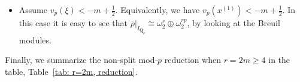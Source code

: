 \documentclass[11pt]{amsart}
\theoremstyle{definition}
\numberwithin{equation}{subsection}
\theoremstyle{plain}
\theoremstyle{plain}
\theoremstyle{plain}
\theoremstyle{plain}
\theoremstyle{plain}
\theoremstyle{plain}
\theoremstyle{plain}
\theoremstyle{plain}
\theoremstyle{plain}
\theoremstyle{plain}
\theoremstyle{plain}
\theoremstyle{plain}
\theoremstyle{definition}
\theoremstyle{definition}
\theoremstyle{definition}
\theoremstyle{remark}
\renewcommand{\(}{\textup{(}}
\renewcommand{\)}{\textup{)}}
\newcommand{\Q}{\mathbf{Q}}
\newcommand{\Qp}{\mathbf{Q}_p}
\newcommand{\rhobar}{\overline{\rho}}
\begin{document}
\begin{itemize}[leftmargin=*]
\begin{itemize}[leftmargin=*]
    \item If $v_p(\Theta)=0$, then it is easy to see that $\rhobar$ is non-split with $\rhobar|_{I_{\Qp}}\cong
    \begin{tiny}\begin{bmatrix}
    \omega^{r-k} & * \\ 0 & \omega^{k}
    \end{bmatrix}\end{tiny}$ and $\mathrm{MT}=1$. Note that this case coincides with $\mathbf{Case}_\phi(r;k+1)$ when $v_p(x^{(r-k)})=m-k-\frac{1}{2}$.
    \item If $v_p(\Theta)\in(-1,0)$, then $\rhobar|_{I_{\Q_p}}\cong\omega^{k}\oplus\omega^{r-k}$. In particular, it is split.
\end{itemize}
\item Assume $v_p(\xi)<-m+\frac{1}{2}$. Equivalently, we have $v_p(x^{(1)})<-m+\frac{1}{2}$. In this case it is easy to see that  $\rhobar|_{I_{\Qp}}\cong\omega_2^r\oplus\omega_2^{rp}$, by looking at the Breuil modules.
\end{itemize}
Finally, we summarize the non-split mod-$p$ reduction when $r=2m\geq 4$ in the table, Table~\ref{tab: r=2m, reduction}.
\end{document}
